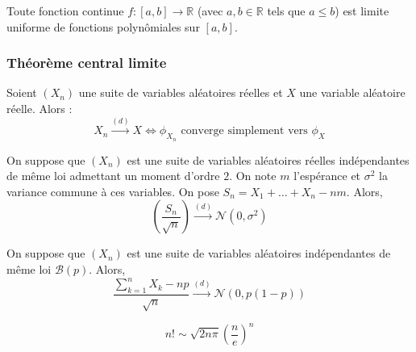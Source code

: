 
  \begin{corollary}
    Toute fonction continue $f : [a,b] \rightarrow \mathbb{R}$ (avec $a, b \in \mathbb{R}$ tels que $a \leq b$) est limite uniforme de fonctions polynômiales sur $[a, b]$.
  \end{corollary}

  \subsubsection{Théorème central limite}


  \begin{theorem}[Lévy]
    \label{theoreme-central-limite-1}
    Soient $(X_n)$ une suite de variables aléatoires réelles et $X$ une variable aléatoire réelle. Alors :
    \[ X_n \overset{(d)}{\longrightarrow} X \iff \phi_{X_n} \text{ converge simplement vers } \phi_X \]
  \end{theorem}


  \begin{theorem}
    On suppose que $(X_n)$ est une suite de variables aléatoires réelles indépendantes de même loi admettant un moment d'ordre $2$. On note $m$ l'espérance et $\sigma^2$ la variance commune à ces variables. On pose $S_n = X_1 + \dots + X_n - nm$. Alors,
    \[ \left ( \frac{S_n}{\sqrt{n}} \right) \overset{(d)}{\longrightarrow} \mathcal{N}(0, \sigma^2) \]
  \end{theorem}

  \begin{application}
    On suppose que $(X_n)$ est une suite de variables aléatoires indépendantes de même loi $\mathcal{B}(p)$. Alors,
    \[ \frac{\sum_{k=1}^{n} X_k - np}{\sqrt{n}} \overset{(d)}{\longrightarrow} \mathcal{N}(0, p(1-p)) \]
  \end{application}


  \begin{application}
    \[ n! \sim \sqrt{2n\pi} \left(\frac{n}{e} \right)^n \]
  \end{application}


